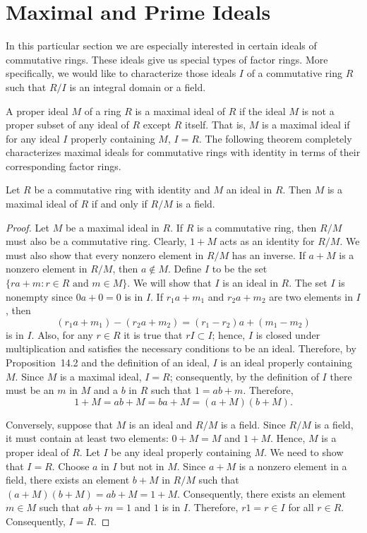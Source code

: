 \section{Maximal and Prime Ideals}
 
 
In this particular section we are especially interested in certain
ideals of commutative rings. These ideals give us special types of factor
rings. More specifically, we would like to characterize those ideals
$I$ of a commutative ring $R$ such that $R/I$ is an integral domain or
a field.  
 
 
A proper ideal $M$ of a ring $R$ is a {\bfi maximal
ideal\/} of $R$ if the ideal
$M$ is not a proper subset of any ideal of $R$ except $R$ itself.
That is, $M$ is a 
maximal ideal if for any ideal $I$ properly containing $M$, $I = R$.
The following theorem completely characterizes maximal ideals for
commutative rings with identity in terms of their corresponding factor
rings.  
 
 
\begin{theorem}
Let $R$ be a commutative ring with identity and $M$ an ideal in $R$.
Then $M$ is a maximal ideal of $R$ if and only if $R/M$ is a field. 
\end{theorem}
 
 
\begin{proof}
Let $M$ be a maximal ideal in $R$. If $R$ is a commutative ring, then
$R/M$ must also be a commutative ring.  Clearly, $1 + M$ acts as an
identity for $R/M$. We must also show that every nonzero element in
$R/M$ has an inverse.  If $a+M$ is a nonzero element in $R/M$, then $a
\notin M$. Define $I$ to be the set $\{ ra +m : r \in R \mbox{ and } m
\in M \}$. We will show that $I$ is an ideal in $R$. The set $I$ is
nonempty since $0a+0=0$ is in $I$. If $r_1 a +m_1$ and $r_2 a +m_2$
are two elements in $I$, then 
\[
(r_1 a + m_1) - ( r_2 a +m_2) = (r_1 - r_2)a + (m_1 -m_2)
\]
is in $I$. Also, for any $r \in R$ it is true that $rI \subset I$;
hence, $I$ is closed under multiplication and satisfies the
necessary conditions to be an ideal. Therefore, by Proposition~14.2
and the definition of an ideal, $I$ is an ideal properly containing
$M$. Since $M$ is a maximal ideal, $I=R$; consequently, by the
definition of $I$ there must be an $m$ in $M$ and a $b$ in $R$ such that
$1=ab+m$. Therefore, 
\[
1 + M = ab + M = ba + M = (a+M)(b+M).
\]
 
 
Conversely, suppose that $M$ is an ideal and $R/M$ is a field. Since
$R/M$ is a field, it must contain at least two elements: $0 + M = M$
and $1 + M$. Hence, $M$ is a proper ideal of $R$.  Let $I$ be any
ideal properly containing $M$. We need to show that $I = R$. Choose
$a$ in $I$ but not in $M$. Since $a+ M$ is a nonzero element in a
field, there exists an element $b +M$ in $R/M$ such that $(a+M)(b+M) =
ab + M = 1+M$.  Consequently, there exists an element $m \in M$ such
that $ab + m = 1$ and $1$ is in $I$. Therefore, $r1 =r \in I$ for all
$r \in R$. Consequently, $I = R$. 
\end{proof}
 
